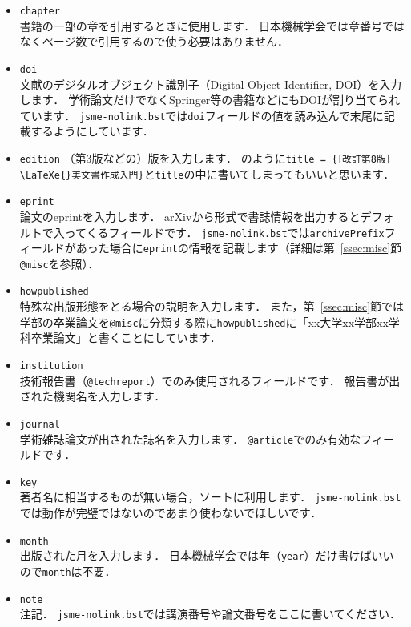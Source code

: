 \documentclass[a4paper,fleqn,uplatex,dvipdfmx]{jsarticle}
\makeatletter
\newcommand{\jsmefile}{\texttt{jsme-nolink.bst}}
\newcommand{\ttarticle}{\texttt{@article}}
\newcommand{\ttmisc}{\texttt{@misc}}
\newcommand{\tttechreport}{\texttt{@techreport}}
\makeatother
\begin{document}
\begin{itemize}
    \item \verb|chapter| \\
        書籍の一部の章を引用するときに使用します．
        日本機械学会では章番号ではなくページ数で引用するので使う必要はありません．
    \item \verb|doi| \\
        文献のデジタルオブジェクト識別子（Digital Object Identifier, DOI）を入力します．
        学術論文だけでなくSpringer等の書籍などにもDOIが割り当てられています．
        \jsmefile では\verb|doi|フィールドの値を読み込んで末尾に記載するようにしています．
    \item \verb|edition|
        （第3版などの）版を入力します．
        \citet{奥村:技評2020}のように\verb|title = {［改訂第8版］\LaTeXe{}美文書作成入門}|と\verb|title|の中に書いてしまってもいいと思います．
    \item \verb|eprint| \\
        論文のeprintを入力します．
        arXivから\BibTeX{}形式で書誌情報を出力するとデフォルトで入ってくるフィールドです．
        \jsmefile では\verb|archivePrefix|フィールドがあった場合に\verb|eprint|の情報を記載します（詳細は第~\ref{ssec:misc}節\ttmisc を参照）．
    \item \verb|howpublished| \\
        特殊な出版形態をとる場合の説明を入力します．
        また，第~\ref{ssec:misc}節では学部の卒業論文を\ttmisc に分類する際に\verb|howpublished|に「xx大学xx学部xx学科卒業論文」と書くことにしています．
    \item \verb|institution| \\
        技術報告書（\tttechreport）でのみ使用されるフィールドです．
        報告書が出された機関名を入力します．
    \item \verb|journal| \\
        学術雑誌論文が出された誌名を入力します．
        \ttarticle でのみ有効なフィールドです．
    \item \verb|key| \\
        著者名に相当するものが無い場合，ソートに利用します．
        \jsmefile では動作が完璧ではないのであまり使わないでほしいです．
    \item \verb|month| \\
        出版された月を入力します．
        日本機械学会では年（\verb|year|）だけ書けばいいので\verb|month|は不要．
    \item \verb|note| \\
        注記．
        \jsmefile では講演番号や論文番号をここに書いてください．

\end{itemize}
\end{document}
